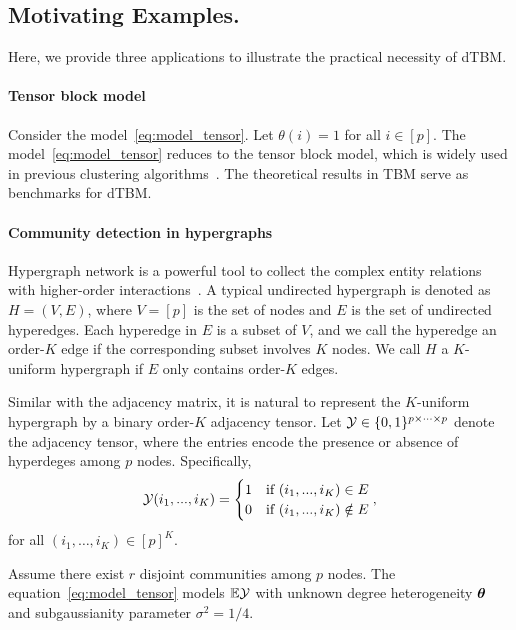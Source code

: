 \documentclass[lettersize,onecolumn,journal]{IEEEtran}
\theoremstyle{definition}
\theoremstyle{definition}
\begin{document}
{
\color{blue}

\subsection{Motivating Examples.} Here, we provide three applications to illustrate the practical necessity of dTBM.

\vspace{0.2cm}
\paragraph{Tensor block model} Consider the model~\eqref{eq:model_tensor}. Let $\theta(i)=1$ for all $ i \in [p]$. The model~\eqref{eq:model_tensor} reduces to the tensor block model, which is widely used in previous clustering algorithms~\citep{wang2019multiway,chi2020provable,han2020exact}. The theoretical results in TBM serve as benchmarks for dTBM.  

\vspace{0.2cm}

\paragraph{Community detection in hypergraphs} Hypergraph network is a powerful tool to collect the complex entity relations with higher-order interactions~\citep{ke2019community}. A typical undirected hypergraph is denoted as $H = (V,E)$, where $V = [p]$ is the set of nodes and $E$ is the set of undirected hyperedges. Each hyperedge in $E$ is a subset of $V$, and we call the hyperedge an order-$K$ edge if the corresponding subset involves $K$ nodes. We call $H$ a $K$-uniform hypergraph if $E$ only contains order-$K$ edges. 

Similar with the adjacency matrix, it is natural to represent the $K$-uniform hypergraph by a binary order-$K$ adjacency tensor. Let $\mathcal{Y} \in \{0,1\}^{p \times \cdots \times p}$ denote the adjacency tensor, where the entries encode the presence or absence of hyperdeges among $p$ nodes. Specifically, 
\begin{equation}
    \mathcal{Y}(i_1,...,i_K) =  \begin{cases}
    1  & \text{if }  (i_1,...,i_K) \in E\\
    0 & \text{if }  (i_1,...,i_K) \notin E
    \end{cases},
\end{equation}
for all $(i_1,\ldots,i_K) \in [p]^K$. 

Assume there exist $r$ disjoint communities among $p$ nodes. The equation~\eqref{eq:model_tensor} models $\mathbb{E}\mathcal{Y}$ with unknown degree heterogeneity $\boldsymbol{\theta}$ and subgaussianity parameter $\sigma^2 = 1/4$.  

}
\end{document}

